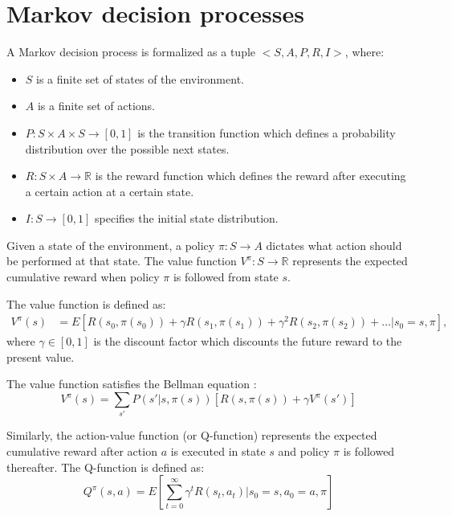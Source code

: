 
\section{Markov decision processes}
\label{se:MDP}

\begin{definition} A Markov decision process is formalized as a tuple $<S, A, P, R, I>$, where:
\begin{itemize}
    \item $S$ is a finite set of states of the environment.
    \item $A$ is a finite set of actions.
    \item $P:S \times A \times S \rightarrow [0, 1]$ is the transition function which defines a probability distribution over the possible next states.
    \item $R:S \times A \rightarrow \mathbb{R}$ is the reward function which defines the reward after executing a certain action at a certain state.
    \item $I:S \rightarrow [0, 1]$ specifies the initial state distribution.
 \end{itemize}
\end{definition}

Given a state of the environment, a policy $\pi: S \rightarrow A$ dictates what action should be performed at that state. 
The value function $V^{\pi}: S \rightarrow \mathbb{R}$ represents the expected cumulative reward when 
policy $\pi$ is followed from state $s$.

The value function is defined as:
\begin{align}
    V^{\pi}(s) &= E[R(s_0, \pi(s_0)) + \gamma R(s_1, \pi(s_1)) + \gamma^2 R(s_2, \pi(s_2)) + \dots | s_0 = s, \pi],
    \label{eq:defV}
\end{align}
where $\gamma \in [0, 1]$ is the discount factor which discounts the future reward to the present value.

The value function satisfies the Bellman equation \cite{Bellman57}:
\begin{equation}
    V^{\pi}(s) = \sum_{s'}P(s'|s, \pi(s))[R(s, \pi(s)) + \gamma V^{\pi}(s')]
    \label{eq:V}
\end{equation}

Similarly, the action-value function (or Q-function) represents the expected
cumulative reward after action $a$ is executed in state $s$ and policy $\pi$ is
followed thereafter.
The Q-function is defined as:
\begin{equation}
    Q^{\pi}(s, a) = E[\sum_{t=0}^{\infty}\gamma^t R(s_t, a_t) | s_0=s, a_0 = a, \pi]
\end{equation}

